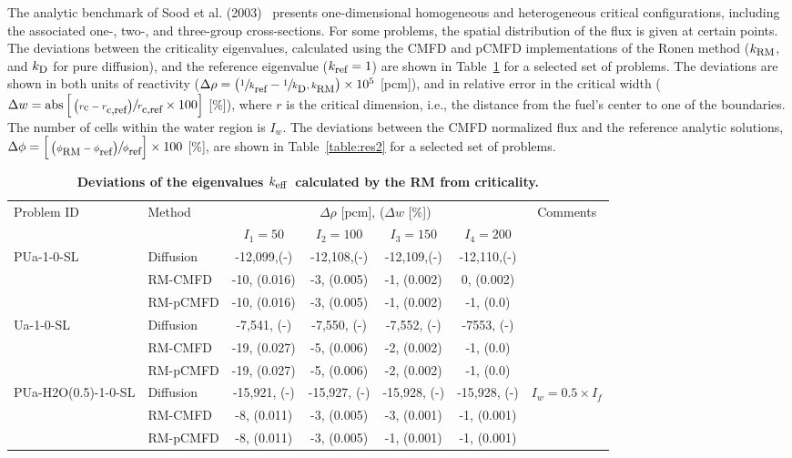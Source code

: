 \documentclass[letterpaper]{mc2021}
\newcommand{\keff}{\ensuremath{k_{\textrm{\scriptsize{eff}}}}}
\newcommand{\kref}{\ensuremath{k_{\textrm{\scriptsize{ref}}}}}
\newcommand{\kd}{\ensuremath{k_{\textrm{\scriptsize{D}}}}}
\newcommand{\krm}{\ensuremath{k_{\textrm{\scriptsize{RM}}}}}
\newcommand{\rcref}{\ensuremath{r_{\textrm{\scriptsize{c,ref}}}}}
\newcommand{\rc}{\ensuremath{r_{\textrm{\scriptsize{c}}}}}
\newcommand{\phiref}{\ensuremath{\phi_{\textrm{\scriptsize{ref}}}}}
\newcommand{\phirm}{\ensuremath{\phi_{\textrm{\scriptsize{RM}}}}}
\begin{document}
The analytic benchmark of Sood et al. (2003)~\cite{Sood2003} presents one-dimensional homogeneous and heterogeneous critical configurations, including the associated one-, two-, and three-group cross-sections. For some problems, the spatial distribution of the flux is given at certain points. 
%
The deviations between the criticality eigenvalues, calculated using the CMFD and pCMFD implementations of the Ronen method ($\krm$, and $\kd$ for pure diffusion), and the reference eigenvalue ($\kref=1$) are shown in Table~\ref{table:res1} for a selected set of problems. The deviations are shown in both units of reactivity ($\Delta\rho = \left(\sfrac{1}{\kref}- \sfrac{1}{\kd,\krm}\right)\times 10^5$ [pcm]), and in relative error in the critical width ($\Delta w = \text{abs}\left[ \sfrac{ \left( \rc-\rcref\right)}{\rcref}\times 100\right]$ [\%]), where $r$ is the critical dimension, i.e., the distance from the fuel's center to one of the boundaries. The number of cells within the water region is $I_w$.
%
The deviations between the CMFD normalized flux and the reference analytic solutions,  $\Delta\phi = \left[\sfrac{\left(\phirm - \phiref\right)}{\phiref}\right]\times 100$ [\%], are shown in Table~\ref{table:res2} for a selected set of problems. 
%
\begin{table}[!htb]
	\vspace{-7.5mm}	
	\centering
	\small
	\caption{\bf Deviations of the eigenvalues \keff \ calculated by the RM from criticality.}
	\label{table:res1} 
  \begin{tabular}{|l|l|c|c|c|c|c|} \hline 
	\multirow{2}{*}{Problem ID} & \multirow{2}{*}{Method} & \multicolumn{4}{c|}{$\Delta\rho$ [pcm], ($\Delta w$ [\%])} & \multirow{2}{*}{Comments} \\ 
	\cline{3-6}
	&  	 & $I_1 = 50$   & $I_2 = 100$ & $I_3 = 150$ & $I_4 = 200$    & \\ 
	\hline
	\multirow{3}{*}{PUa-1-0-SL} 		 & Diffusion  & -12,099,(-)  & -12,108,(-) & -12,109,(-) &-12,110,(-)   & \multirow{2}{*}{}\\ 
	\cline{2-6}
	& RM-CMFD  & -10, (0.016) & -3, (0.005) & -1, (0.002) & 0, (0.002)      & \multirow{2}{*}{}\\ 
	\cline{2-6}
	& RM-pCMFD & -10, (0.016) & -3, (0.005) & -1, (0.002) & -1, (0.0) & \\ 
	\hline
	\multirow{3}{*}{Ua-1-0-SL} 		     & Diffusion  & -7,541, (-)  & -7,550, (-) & -7,552, (-)  & -7553, (-)  & \multirow{2}{*}{}\\ 
	\cline{2-6}
	& RM-CMFD  & -19, (0.027)  & -5, (0.006) & -2, (0.002)  & -1, (0.0)  & \multirow{2}{*}{}\\ 
	\cline{2-6}
	& RM-pCMFD & -19, (0.027)  & -5, (0.006) & -2, (0.002)  & -1, (0.0)	  & \\ 
	\hline
	\multirow{2}{*}{PUa-H2O(0.5)-1-0-SL} & Diffusion  & -15,921, (-) & -15,927, (-) & -15,928, (-) & -15,928, (-) & \multirow{2}{*}{$I_w = 0.5\times I_f$} \\ 
	\cline{2-6}
	& RM-CMFD  & -8, (0.011)  & -3, (0.005) & -3, (0.001)	& -1, (0.001) &  \\ 
	\cline{2-6}
	& RM-pCMFD &-8, (0.011)	& -3, (0.005) & -1, (0.001)	& -1, (0.001) & \\ 
	\hline
\end{tabular}
\end{table}
\end{document}
